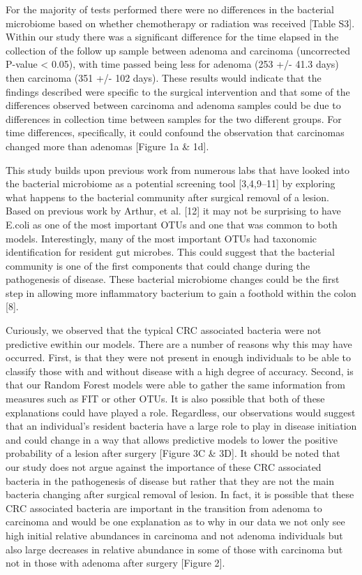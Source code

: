 \documentclass[12pt,]{article}
\begin{document}
For the majority of tests performed there were no differences in the
bacterial microbiome based on whether chemotherapy or radiation was
received {[}Table S3{]}. Within our study there was a significant
difference for the time elapsed in the collection of the follow up
sample between adenoma and carcinoma (uncorrected P-value \textless{}
0.05), with time passed being less for adenoma (253 +/- 41.3 days) then
carcinoma (351 +/- 102 days). These results would indicate that the
findings described were specific to the surgical intervention and that
some of the differences observed between carcinoma and adenoma samples
could be due to differences in collection time between samples for the
two different groups. For time differences, specifically, it could
confound the observation that carcinomas changed more than adenomas
{[}Figure 1a \& 1d{]}.

This study builds upon previous work from numerous labs that have looked
into the bacterial microbiome as a potential screening tool
{[}3,4,9--11{]} by exploring what happens to the bacterial community
after surgical removal of a lesion. Based on previous work by Arthur, et
al. {[}12{]} it may not be surprising to have E.coli as one of the most
important OTUs and one that was common to both models. Interestingly,
many of the most important OTUs had taxonomic identification for
resident gut microbes. This could suggest that the bacterial community
is one of the first components that could change during the pathogenesis
of disease. These bacterial microbiome changes could be the first step
in allowing more inflammatory bacterium to gain a foothold within the
colon {[}8{]}.

Curiously, we observed that the typical CRC associated bacteria were not
predictive ewithin our models. There are a number of reasons why this
may have occurred. First, is that they were not present in enough
individuals to be able to classify those with and without disease with a
high degree of accuracy. Second, is that our Random Forest models were
able to gather the same information from measures such as FIT or other
OTUs. It is also possible that both of these explanations could have
played a role. Regardless, our observations would suggest that an
individual's resident bacteria have a large role to play in disease
initiation and could change in a way that allows predictive models to
lower the positive probability of a lesion after surgery {[}Figure 3C \&
3D{]}. It should be noted that our study does not argue against the
importance of these CRC associated bacteria in the pathogenesis of
disease but rather that they are not the main bacteria changing after
surgical removal of lesion. In fact, it is possible that these CRC
associated bacteria are important in the transition from adenoma to
carcinoma and would be one explanation as to why in our data we not only
see high initial relative abundances in carcinoma and not adenoma
individuals but also large decreases in relative abundance in some of
those with carcinoma but not in those with adenoma after surgery
{[}Figure 2{]}.
\end{document}
